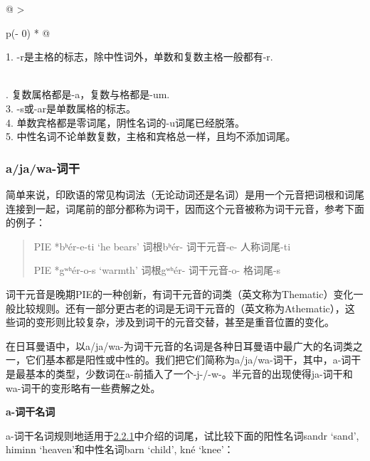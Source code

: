 \begin{longtable}[]{@{}
  >{\raggedright\arraybackslash}p{(\columnwidth - 0\tabcolsep) * }@{}}
  \toprule\noalign{}
  \begin{minipage}[b]{\linewidth}\raggedright
    1. -r是主格的标志，除中性词外，单数和复数主格一般都有-r.
  \end{minipage}     \\
  \midrule\noalign{}
  \endhead
  \bottomrule\noalign{}
  . 复数属格都是-a，复数与格都是-um.                         \\
  3. -s或-ar是单数属格的标志。                                \\
  4. 单数宾格都是零词尾，阴性名词的-u词尾已经脱落。           \\
  5. 中性名词不论单数复数，主格和宾格总一样，且均不添加词尾。 \\
\end{longtable}

\subsubsection{a/ja/wa-词干}\label{ajawa-ux8bcdux5e72}

简单来说，印欧语的常见构词法（无论动词还是名词）是用一个元音把词根和词尾连接到一起，词尾前的部分都称为词干，因而这个元音被称为词干元音，参考下面的例子：

\begin{quote}
  PIE *bʰér-e-ti `he bears' 词根bʰér- 词干元音-e- 人称词尾-ti

  PIE *gʷʰér-o-s `warmth' 词根gʷʰér- 词干元音-o- 格词尾-s
\end{quote}

词干元音是晚期PIE的一种创新，有词干元音的词类（英文称为Thematic）变化一般比较规则。还有一部分更古老的词是无词干元音的（英文称为Athematic），这些词的变形则比较复杂，涉及到词干的元音交替，甚至是重音位置的变化。

在日耳曼语中，以a/ja/wa-为词干元音的名词是各种日耳曼语中最广大的名词类之一，它们基本都是阳性或中性的。我们把它们简称为a/ja/wa-词干，其中，a-词干是最基本的类型，少数词在a-前插入了一个-j-/-w-。半元音的出现使得ja-词干和wa-词干的变形略有一些费解之处。

\textbf{a-词干名词}

a-词干名词规则地适用于\hyperref[ux5f3aux540dux8bcdux7684ux8bcdux5c3e]{2.2.1}中介绍的词尾，试比较下面的阳性名词sandr
`sand', himinn `heaven'和中性名词barn `child', kné `knee'：

